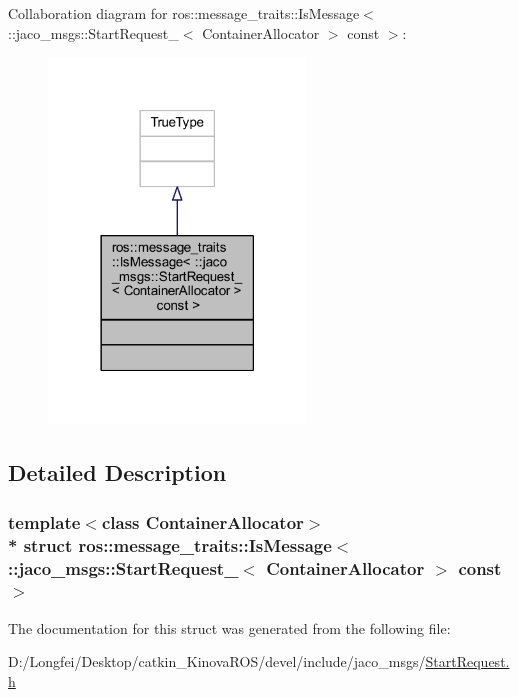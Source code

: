 Collaboration diagram for ros\+:\+:message\+\_\+traits\+:\+:Is\+Message$<$ \+:\+:jaco\+\_\+msgs\+:\+:Start\+Request\+\_\+$<$ Container\+Allocator $>$ const $>$\+:
\nopagebreak
\begin{figure}[H]
\begin{center}
\leavevmode
\includegraphics[width=194pt]{d7/d0d/structros_1_1message__traits_1_1IsMessage_3_01_1_1jaco__msgs_1_1StartRequest___3_01ContainerAllo023ed3599f1bcedca17daeb7b91ba83d}
\end{center}
\end{figure}


\subsection{Detailed Description}
\subsubsection*{template$<$class Container\+Allocator$>$\\*
struct ros\+::message\+\_\+traits\+::\+Is\+Message$<$ \+::jaco\+\_\+msgs\+::\+Start\+Request\+\_\+$<$ Container\+Allocator $>$ const  $>$}



The documentation for this struct was generated from the following file\+:\begin{DoxyCompactItemize}
\item 
D\+:/\+Longfei/\+Desktop/catkin\+\_\+\+Kinova\+R\+O\+S/devel/include/jaco\+\_\+msgs/\hyperlink{StartRequest_8h}{Start\+Request.\+h}\end{DoxyCompactItemize}

